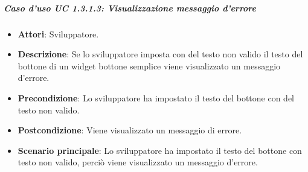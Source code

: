 \subparagraph{Caso d'uso UC 1.3.1.3: Visualizzazione messaggio d'errore}

\FloatBarrier
\begin{itemize}
\item\textbf{Attori}: Sviluppatore.
\item\textbf{Descrizione}: Se lo sviluppatore imposta con del testo non valido il testo del bottone di un widget bottone semplice viene visualizzato un messaggio d'errore.
\item\textbf{Precondizione}: Lo sviluppatore ha impostato il testo del bottone con del testo non valido.
\item\textbf{Postcondizione}: Viene visualizzato un messaggio di errore.
\item \textbf{Scenario principale}: Lo sviluppatore ha impostato il testo del bottone con testo non valido, perciò viene visualizzato un messaggio d'errore.
\end{itemize}
